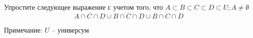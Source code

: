 \question
Упростите следующее выражение с учетом того, что $A\subset B \subset C \subset D \subset U; A \neq \emptyset$
\begin{equation*}
	A \cap C  \cap D \cup B \cap \overline{C} \cap D \cup B \cap C \cap D
\end{equation*}

Примечание: $U$ -- универсум